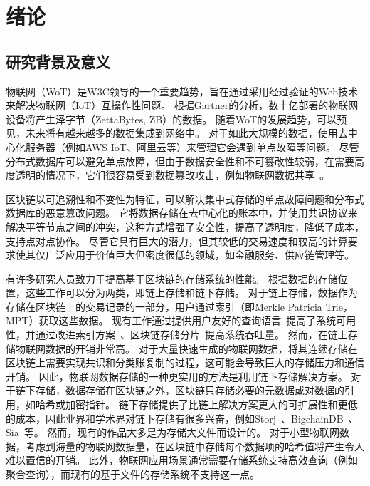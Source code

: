 \chapter{绪论}
\section{研究背景及意义}
物联网（WoT）是W3C领导的一个重要趋势，旨在通过采用经过验证的Web技术来解决物联网（IoT）互操作性问题。
根据Gartner的分析，数十亿部署的物联网设备将产生泽字节（ZettaBytes, ZB）的数据。
随着WoT的发展趋势，可以预见，未来将有越来越多的数据集成到网络中。
对于如此大规模的数据，使用去中心化服务器（例如AWS IoT、阿里云等）来管理它会遇到单点故障等问题。
尽管分布式数据库可以避免单点故障，但由于数据安全性和不可篡改性较弱，在需要高度透明的情况下，它们很容易受到数据篡改攻击，例如物联网数据共享~\cite{chen2022blockchain}。

区块链以可追溯性和不变性为特征，可以解决集中式存储的单点故障问题和分布式数据库的恶意篡改问题。
它将数据存储在去中心化的账本中，并使用共识协议来解决平等节点之间的冲突，这种方式增强了安全性，提高了透明度，降低了成本，支持点对点协作。
尽管它具有巨大的潜力，但其较低的交易速度和较高的计算要求使其仅广泛应用于价值巨大但密度很低的领域，如金融服务、供应链管理等。

有许多研究人员致力于提高基于区块链的存储系统的性能。
根据数据的存储位置，这些工作可以分为两类，即链上存储和链下存储。
对于链上存储，数据作为存储在区块链上的交易记录的一部分，用户通过索引（即Merkle Patricia Trie，MPT）获取这些数据。
现有工作通过提供用户友好的查询语言~\cite{zhu2019sebdb,xu2019vchain,wang2022vchain+}提高了系统可用性，并通过改进索引方案~\cite{li2023lvmt,zhang2024cole}、区块链存储分片~\cite{zamani2018rapidchain,hong2023gridb,el2019blockchaindb}提高系统吞吐量。
然而，在链上存储物联网数据的开销非常高。
对于大量快速生成的物联网数据，将其连续存储在区块链上需要实现共识和分类账复制的过程，这可能会导致巨大的存储压力和通信开销。
因此，物联网数据存储的一种更实用的方法是利用链下存储解决方案。
对于链下存储，数据存储在区块链之外，区块链只存储必要的元数据或对数据的引用，如哈希或加密指针。
链下存储提供了比链上解决方案更大的可扩展性和更低的成本，因此业界和学术界对链下存储有很多兴奋，例如Storj~\cite{storj2018storj}、BigchainDB~\cite{mcconaghy2016bigchaindb}、Sia~\cite{sia}等。
然而，现有的作品大多是为存储大文件而设计的。
对于小型物联网数据，考虑到海量的物联网数据量，在区块链中存储每个数据项的哈希值将产生令人难以置信的开销。
此外，物联网应用场景通常需要存储系统支持高效查询（例如聚合查询），而现有的基于文件的存储系统不支持这一点。

